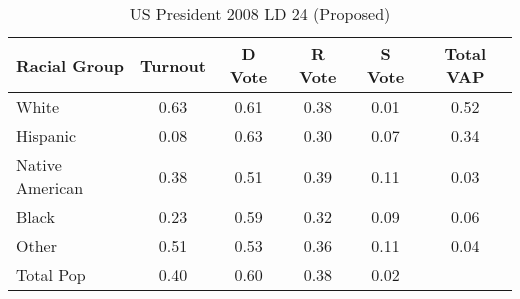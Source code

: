 \begin{table}[htb]
\begin{center}
\caption{US President 2008 LD 24 (Proposed)}
\label{pres08_vap_ld_24}
\begin{tabular}{lccccc}
  \hline
Racial Group & Turnout & D Vote & R Vote & S Vote & Total VAP \\ 
  \hline
White & 0.63 & 0.61 & 0.38 & 0.01 & 0.52 \\ 
  Hispanic & 0.08 & 0.63 & 0.30 & 0.07 & 0.34 \\ 
  Native American & 0.38 & 0.51 & 0.39 & 0.11 & 0.03 \\ 
  Black & 0.23 & 0.59 & 0.32 & 0.09 & 0.06 \\ 
  Other & 0.51 & 0.53 & 0.36 & 0.11 & 0.04 \\ 
  Total Pop & 0.40 & 0.60 & 0.38 & 0.02 &  \\ 
   \hline
\end{tabular}
\end{center}
\end{table}
